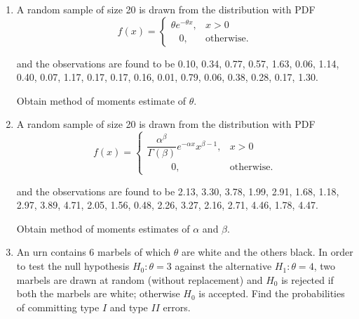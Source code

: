 \documentclass[11pt, a4paper]{article}
\begin{document}
\begin{enumerate}
	
	
	
	
	
	
	\item A random sample of size 20 is drawn from the distribution with PDF
	\begin{equation*}
	 f(x) =
		\begin{cases}
		 \theta e^{-\theta x}, & x > 0  \\
		 \hspace{10pt} 0, & \text{otherwise}.
		\end{cases}
	\end{equation*}
	
and the observations are found to be 0.10, 0.34, 0.77, 0.57, 1.63, 0.06, 1.14, 0.40, 0.07, 1.17, 0.17, 0.17, 0.16, 0.01, 0.79, 0.06, 0.38, 0.28, 0.17, 1.30.

Obtain method of moments estimate of $\theta$.
	
	
	
	
	
	\item A random sample of size 20 is drawn from the distribution with PDF
	\begin{equation*}
	 f(x) =
		\begin{cases}
		 \dfrac{\alpha^{\beta}}{\Gamma(\beta)} e^{-\alpha x}x^{\beta - 1}, & x > 0  \\
		 \hspace{30pt} 0, & \text{otherwise}.
		\end{cases}
	\end{equation*}
	
and the observations are found to be 2.13, 3.30, 3.78, 1.99, 2.91, 1.68, 1.18, 2.97, 3.89, 4.71, 2.05, 1.56, 0.48, 2.26, 3.27, 2.16, 2.71, 4.46, 1.78, 4.47.

Obtain method of moments estimates of $\alpha$ and $\beta$.







	\item An urn contains 6 marbels of which $\theta$ are white and the others black. In order to test the null hypothesis $H_0 : \theta = 3$ against the alternative $H_1 : \theta = 4$, two marbels are drawn at random (without replacement) and $H_0$ is rejected if both the marbels are white; otherwise $H_0$ is accepted. Find the probabilities of committing type $I$ and type $II$ errors.
	
	
	
	
	

\end{enumerate}
\end{document}
